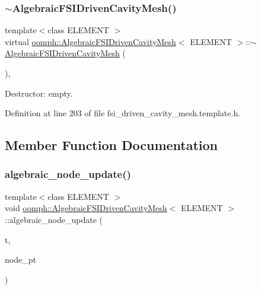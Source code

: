 \subsubsection{\texorpdfstring{$\sim$\+Algebraic\+F\+S\+I\+Driven\+Cavity\+Mesh()}{~AlgebraicFSIDrivenCavityMesh()}}
{\footnotesize\ttfamily template$<$class E\+L\+E\+M\+E\+NT $>$ \\
virtual \hyperlink{classoomph_1_1AlgebraicFSIDrivenCavityMesh}{oomph\+::\+Algebraic\+F\+S\+I\+Driven\+Cavity\+Mesh}$<$ E\+L\+E\+M\+E\+NT $>$\+::$\sim$\hyperlink{classoomph_1_1AlgebraicFSIDrivenCavityMesh}{Algebraic\+F\+S\+I\+Driven\+Cavity\+Mesh} (\begin{DoxyParamCaption}{ }\end{DoxyParamCaption})\hspace{0.3cm}{\ttfamily [inline]}, {\ttfamily [virtual]}}



Destructor\+: empty. 



Definition at line 203 of file fsi\+\_\+driven\+\_\+cavity\+\_\+mesh.\+template.\+h.



\subsection{Member Function Documentation}
\mbox{\label{classoomph_1_1AlgebraicFSIDrivenCavityMesh_a56c72b78935e84f7fef3f6b5d85556c3}} 
\subsubsection{\texorpdfstring{algebraic\+\_\+node\+\_\+update()}{algebraic\_node\_update()}}
{\footnotesize\ttfamily template$<$class E\+L\+E\+M\+E\+NT $>$ \\
void \hyperlink{classoomph_1_1AlgebraicFSIDrivenCavityMesh}{oomph\+::\+Algebraic\+F\+S\+I\+Driven\+Cavity\+Mesh}$<$ E\+L\+E\+M\+E\+NT $>$\+::algebraic\+\_\+node\+\_\+update (\begin{DoxyParamCaption}\item[{const unsigned \&}]{t,  }\item[{Algebraic\+Node $\ast$\&}]{node\+\_\+pt }\end{DoxyParamCaption})}



